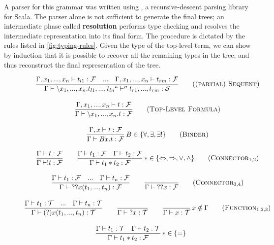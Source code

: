 A parser for this grammar was written using  \cite{Moors2008}, a recursive-descent parsing library for Scala. The parser alone is not sufficient to generate the final trees; an intermediate phase called \textbf{resolution} performs type checking and resolves the intermediate representation into its final form. The procedure is dictated by the rules listed in \autoref{fig:typing-rules}. Given the type of the top-level term, we can show by induction that it is possible to recover all the remaining types in the tree, and thus reconstruct the final representation of the tree.

\begin{figure}[H]
  \centering
  \begin{framed}
  \begin{gather}
  \frac{\Gamma, x_1, ..., x_n \vdash t_{l1}: \mathcal{F} \quad ... \quad \Gamma, x_1, ..., x_n \vdash t_{rm}: \mathcal{F}}{\Gamma \vdash \backslash x_1, ..., x_n. t_{l1}, ..., t_{ln} ``\vdash'' t_{r1}, ..., t_{rm}: \mathcal{S}} \tag{\textsc{(partial) Sequent}} \\[1em]
  \frac{\Gamma, x_1, ..., x_n \vdash t: \mathcal{F}}{\Gamma \vdash \backslash x_1, ..., x_n. t: \mathcal{F}} \tag{\textsc{Top-Level Formula}} \\[1em]
  \frac{\Gamma, x \vdash t: \mathcal{F}}{\Gamma \vdash B x. t: \mathcal{F}} \mkern3mu B \in \{\forall, \exists, \exists!\} \tag{\textsc{Binder}} \\[1em]
  \frac{\Gamma \vdash t: \mathcal{F}}{\Gamma \vdash !t: \mathcal{F}} \quad\quad
  \frac{\Gamma \vdash t_1: \mathcal{F} \quad \Gamma \vdash t_2: \mathcal{F}}{\Gamma \vdash t_1 \ast t_2 : \mathcal{F}} \mkern3mu \ast \in \{\Leftrightarrow, \Rightarrow, \lor, \land\}
  \tag{$\textsc{Connector}_{1,2}$} \\[1em]
  \frac{\Gamma \vdash t_1: \mathcal{F} \quad ... \quad \Gamma \vdash t_n: \mathcal{F}}{\Gamma \vdash {??x}(t_1, ..., t_n) : \mathcal{F}} \quad\quad
  \frac{}{\Gamma \vdash {??x}: \mathcal{F}}
  \tag{$\textsc{Connector}_{3,4}$} \\[1em]
  \frac{\Gamma \vdash t_1: \mathcal{T} \quad ... \quad \Gamma \vdash t_n: \mathcal{T}}{\Gamma \vdash (?)x(t_1, ..., t_n): \mathcal{T}} \quad\quad
  \frac{}{\Gamma \vdash {?x}: \mathcal{T}} \quad\quad
  \frac{}{\Gamma \vdash x: \mathcal{T}} \mkern3mu x \notin \Gamma
  \tag{$\textsc{Function}_{1,2,3}$} \\[1em]
  \frac{\Gamma \vdash t_1: \mathcal{T} \quad \Gamma \vdash t_2: \mathcal{T}}{\Gamma \vdash t_1 \ast t_2: \mathcal{F}} \mkern3mu \ast \in \{=\} \quad\quad

\end{gather}
\end{framed}
\end{figure}
